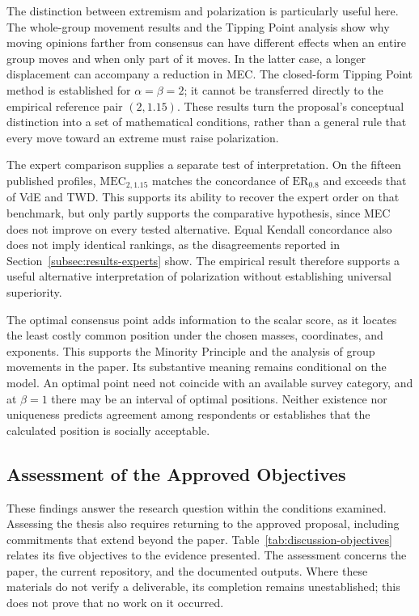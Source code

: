\documentclass{article}
\theoremstyle{plain}
\theoremstyle{remark}
\begin{document}
The distinction between extremism and polarization is particularly useful here. The whole-group movement results and the Tipping Point analysis show why moving opinions farther from consensus can have different effects when an entire group moves and when only part of it moves. In the latter case, a longer displacement can accompany a reduction in MEC. The closed-form Tipping Point method is established for $\alpha=\beta=2$; it cannot be transferred directly to the empirical reference pair $(2,1.15)$. These results turn the proposal's conceptual distinction into a set of mathematical conditions, rather than a general rule that every move toward an extreme must raise polarization.

The expert comparison supplies a separate test of interpretation. On the fifteen published profiles, $\mathrm{MEC}_{2,1.15}$ matches the concordance of $\mathrm{ER}_{0.8}$ and exceeds that of VdE and TWD. This supports its ability to recover the expert order on that benchmark, but only partly supports the comparative hypothesis, since MEC does not improve on every tested alternative. Equal Kendall concordance also does not imply identical rankings, as the disagreements reported in Section~\ref{subsec:results-experts} show. The empirical result therefore supports a useful alternative interpretation of polarization without establishing universal superiority.

The optimal consensus point adds information to the scalar score, as it locates the least costly common position under the chosen masses, coordinates, and exponents. This supports the Minority Principle and the analysis of group movements in the paper. Its substantive meaning remains conditional on the model. An optimal point need not coincide with an available survey category, and at $\beta=1$ there may be an interval of optimal positions. Neither existence nor uniqueness predicts agreement among respondents or establishes that the calculated position is socially acceptable.

\subsection{Assessment of the Approved Objectives}\label{subsec:discussion-objectives}

These findings answer the research question within the conditions examined. Assessing the thesis also requires returning to the approved proposal, including commitments that extend beyond the paper. Table~\ref{tab:discussion-objectives} relates its five objectives to the evidence presented. The assessment concerns the paper, the current repository, and the documented outputs. Where these materials do not verify a deliverable, its completion remains unestablished; this does not prove that no work on it occurred.
\end{document}
